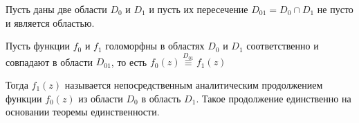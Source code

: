 \documentclass[a4paper, 12pt]{report}
\begin{document}
Пусть даны две области $D_0$ и $D_1$ и пусть их пересечение $D_{01}=D_0 \cap D_1$ не пусто и является областью.
\begin{figure}
\end{figure}
Пусть функции $f_0$ и $f_1$ голоморфны в областях $D_0$ и $D_1$ соответственно и совпадают в области $D_{01}$, то есть
$f_0(z) \overset{D_{01}}{\equiv} f_1(z)$

Тогда $f_1(z)$ называется непосредственным аналитическим продолжением функции $f_0(z)$ из области $D_0$ в область $D_1$.
Такое продолжение единственно на основании теоремы единственности.
\end{document}
